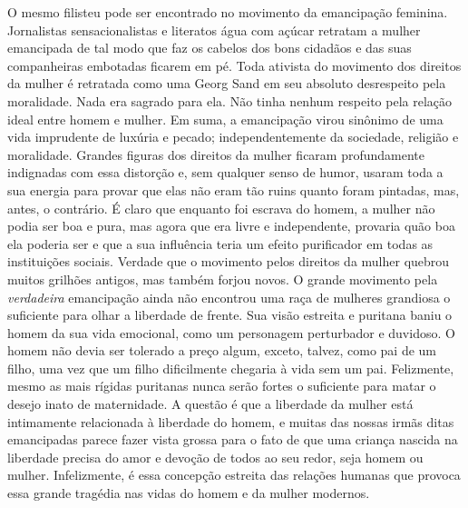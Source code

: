 O mesmo filisteu pode ser encontrado no movimento da emancipação
feminina. Jornalistas sensacionalistas e literatos água com açúcar
retratam a mulher emancipada de tal modo que faz os cabelos dos bons
cidadãos e das suas companheiras embotadas ficarem em pé. Toda ativista
do movimento dos direitos da mulher é retratada como uma Georg Sand em
seu absoluto desrespeito pela moralidade. Nada era sagrado para ela. Não
tinha nenhum respeito pela relação ideal entre homem e mulher. Em suma,
a emancipação virou sinônimo de uma vida imprudente de luxúria e pecado;
independentemente da sociedade, religião e moralidade. Grandes figuras
dos direitos da mulher ficaram profundamente indignadas com essa
distorção e, sem qualquer senso de humor, usaram toda a sua energia para
provar que elas não eram tão ruins quanto foram pintadas, mas, antes, o
contrário. É claro que enquanto foi escrava do homem, a mulher não podia
ser boa e pura, mas agora que era livre e independente, provaria quão
boa ela poderia ser e que a sua influência teria um efeito purificador
em todas as instituições sociais. Verdade que o movimento pelos direitos
da mulher quebrou muitos grilhões antigos, mas também forjou novos. O
grande movimento pela \textit{verdadeira} emancipação ainda não encontrou
uma raça de mulheres grandiosa o suficiente para olhar a liberdade de
frente. Sua visão estreita e puritana baniu o homem da sua vida
emocional, como um personagem perturbador e duvidoso. O homem não devia
ser tolerado a preço algum, exceto, talvez, como pai de um filho, uma
vez que um filho dificilmente chegaria à vida sem um pai. Felizmente,
mesmo as mais rígidas puritanas nunca serão fortes o suficiente para
matar o desejo inato de maternidade. A questão é que a liberdade da
mulher está intimamente relacionada à liberdade do homem, e muitas das
nossas irmãs ditas emancipadas parece fazer vista grossa para o fato de
que uma criança nascida na liberdade precisa do amor e devoção de todos
ao seu redor, seja homem ou mulher. Infelizmente, é essa concepção
estreita das relações humanas que provoca essa grande tragédia nas vidas
do homem e da mulher modernos.

